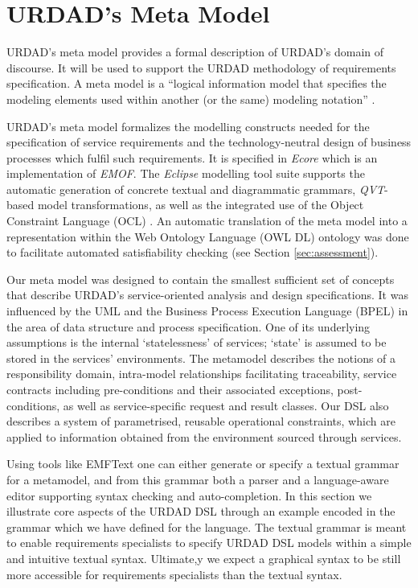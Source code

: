 \section{URDAD's Meta Model \label{sec:metamodel}}

URDAD's meta model provides a formal description of URDAD's domain of discourse. It will be used to support the URDAD methodology of requirements specification. A meta model is a ``logical information model that specifies the modeling elements used within another (or the same) modeling notation'' \cite{_ieee_2003}. 

URDAD's meta model formalizes the modelling constructs needed for the specification of service requirements and the technology-neutral design of business processes which fulfil such requirements. It is specified in \emph{Ecore} which is an implementation of \emph{EMOF}. The \emph{Eclipse} modelling tool suite\cite{gronback_model_2008} supports the automatic generation of concrete textual and diagrammatic grammars, \emph{QVT}-based model transformations, as well as the integrated use of the Object Constraint Language (OCL) \cite{_object_2010}. An automatic translation of the meta model into a representation within the Web Ontology Language (OWL DL) ontology was done to facilitate automated satisfiability checking (see Section \ref{sec:assessment}).

Our meta model was designed to contain the smallest sufficient set of concepts that describe URDAD's service-oriented analysis and design specifications.  It was influenced by the UML and the Business Process Execution Language (BPEL) in the area of data structure and process specification. One of its underlying assumptions is the internal `statelessness' of services; `state' is assumed to be stored in the services' environments. The metamodel describes the notions of a responsibility domain, intra-model relationships facilitating traceability, service contracts including pre-conditions and their associated exceptions, post-conditions, as well as service-specific request and result classes. Our DSL also describes a system of parametrised, reusable operational constraints, which are applied to information obtained from the environment sourced through services.

Using tools like EMFText \cite{heidenreich_derivation_2009} one can either generate or specify a textual grammar for a metamodel, and from this grammar both a parser and a language-aware editor supporting syntax checking and auto-completion. In this section we illustrate core aspects of the URDAD DSL through an example encoded in the grammar which we have defined for the language. The textual grammar is meant to enable requirements specialists to specify URDAD DSL models within a simple and intuitive textual syntax. Ultimate,y we expect a graphical syntax to be still more accessible for requirements specialists than the textual syntax.

